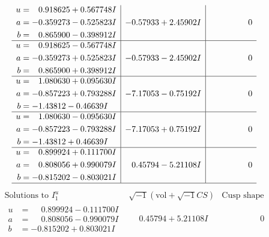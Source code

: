 \documentclass[1p]{elsarticle_modified}
\theoremstyle{definition}
\newcommand{\I}{\sqrt{-1}}
\begin{document}
$$\begin{array}{c|c|c}
\begin{aligned}
u &= \phantom{-}0.918625 + 0.567748 I \\
a &= -0.359273 - 0.525823 I \\
b &= \phantom{-}0.865900 - 0.398912 I\end{aligned}
 & -0.57933 + 2.45902 I & \phantom{-0.000000 } 0 \\ \hline\begin{aligned}
u &= \phantom{-}0.918625 - 0.567748 I \\
a &= -0.359273 + 0.525823 I \\
b &= \phantom{-}0.865900 + 0.398912 I\end{aligned}
 & -0.57933 - 2.45902 I & \phantom{-0.000000 } 0 \\ \hline\begin{aligned}
u &= \phantom{-}1.080630 + 0.095630 I \\
a &= -0.857223 + 0.793288 I \\
b &= -1.43812 - 0.46639 I\end{aligned}
 & -7.17053 - 0.75192 I & \phantom{-0.000000 } 0 \\ \hline\begin{aligned}
u &= \phantom{-}1.080630 - 0.095630 I \\
a &= -0.857223 - 0.793288 I \\
b &= -1.43812 + 0.46639 I\end{aligned}
 & -7.17053 + 0.75192 I & \phantom{-0.000000 } 0 \\ \hline\begin{aligned}
u &= \phantom{-}0.899924 + 0.111700 I \\
a &= \phantom{-}0.808056 + 0.990079 I \\
b &= -0.815202 - 0.803021 I\end{aligned}
 & \phantom{-}0.45794 - 5.21108 I & \phantom{-0.000000 } 0\\
 \hline 
 \end{array}$$\newpage$$\begin{array}{c|c|c}  
\text{Solutions to }I^u_{1}& \I (\text{vol} + \sqrt{-1}CS) & \text{Cusp shape}\\
 \hline 
\begin{aligned}
u &= \phantom{-}0.899924 - 0.111700 I \\
a &= \phantom{-}0.808056 - 0.990079 I \\
b &= -0.815202 + 0.803021 I\end{aligned}
 & \phantom{-}0.45794 + 5.21108 I & \phantom{-0.000000 } 0 \\ \hline\begin{aligned}

\end{aligned}
\end{array}$$
\end{document}
